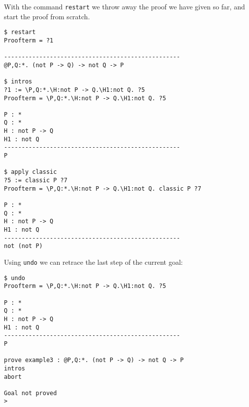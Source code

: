 With the command {\tt restart} 
we throw away the proof we have given so far, and start the proof from
scratch.
\begin{verbatim}
$ restart
Proofterm = ?1

--------------------------------------------------
@P,Q:*. (not P -> Q) -> not Q -> P

$ intros
?1 := \P,Q:*.\H:not P -> Q.\H1:not Q. ?5
Proofterm = \P,Q:*.\H:not P -> Q.\H1:not Q. ?5

P : *
Q : *
H : not P -> Q
H1 : not Q
--------------------------------------------------
P

$ apply classic
?5 := classic P ?7
Proofterm = \P,Q:*.\H:not P -> Q.\H1:not Q. classic P ?7

P : *
Q : *
H : not P -> Q
H1 : not Q
--------------------------------------------------
not (not P)
\end{verbatim}

Using {\tt undo} we can retrace the last step of the current goal:
\begin{verbatim}
$ undo
Proofterm = \P,Q:*.\H:not P -> Q.\H1:not Q. ?5

P : *
Q : *
H : not P -> Q
H1 : not Q
--------------------------------------------------
P

prove example3 : @P,Q:*. (not P -> Q) -> not Q -> P
intros
abort

Goal not proved
> 
\end{verbatim}


